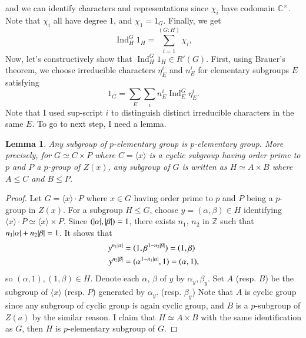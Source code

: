 \documentclass[a4paper, 12pt]{article}
\theoremstyle{Mydefinition}
\theoremstyle{Mytheorem}
\newtheorem{lemma}[statement]{Lemma}
\DeclareMathOperator{\Ind}{Ind}
\begin{document}
\begin{enumerate}
    and we can identify characters and representations since $\chi_i$ have codomain $\mathbb{C}^\times$. Note that $\chi_i$ all have degree $1$, and $\chi_1 = 1_G$. Finally, we get 
    \begin{equation}
        \Ind_H^G 1_H = \sum_{i=1}^{(G:H)}\chi_i,
    \end{equation}
    Now, let's constructively show that $\Ind_H^G 1_H\in R'(G)$. First, using Brauer's theorem, we choose irreducible characters $\eta^i_E$ and $n_E^i$ for elementary subgroups $E$ satisfying
    \begin{equation}\label{HW9:Eq:1}
        1_G = \sum_{E}\sum_i n_E^i\Ind_E^G \eta^i_E.
    \end{equation}
    Note that I used sup-script $i$ to distinguish distinct irreducible characters in the same $E$. 
    To go to next step, I need a lemma.
    \begin{lemma}
    Any subgroup of $p$-elementary group is $p$-elementary group. More precisely, for $G\simeq C\times P$ where $C=\langle x\rangle$ is a cyclic subgroup having order prime to $p$ and $P$ a $p$-group of $Z(x)$, any subgroup of $G$ is written as $H\simeq A\times B$ where $A\leq C$ and $B\leq P$.
    \end{lemma}
    \begin{proof}
    Let $G=\langle x\rangle\cdot P$ where $x\in G$ having order prime to $p$ and $P$ being a $p$-group in $Z(x)$. For a subgroup $H\leq G$, choose $y=(\alpha, \beta)\in H$ identifying $\langle x\rangle\cdot P\simeq \langle x\rangle\times P$. Since $(\abs{\alpha},\abs{\beta})=1$, there exists $n_1$, $n_2$ in $\mathbb{Z}$ such that $n_1\abs{\alpha}+n_2\abs{\beta} = 1$. It shows that
    \begin{equation}
    \begin{split}
        y^{n_1\abs{\alpha}} &= (1, \beta^{1-n_2\abs{\beta}}) = (1,\beta)\\
        y^{n_2\abs{\beta}} &= (\alpha^{1-n_1\abs{\alpha}}, 1) = (\alpha,1),
    \end{split}
    \end{equation}
    so $(\alpha,1),(1,\beta)\in H$. Denote each $\alpha$, $\beta$ of $y$ by $\alpha_y, \beta_y$. Set $A$ (resp. $B$) be the subgroup of $\langle x\rangle$ (resp. $P$) generated by $\alpha_y$. (resp. $\beta_y$) Note that $A$ is cyclic group since any subgroup of cyclic group is again cyclic group, and $B$ is a $p$-subgroup of $Z(a)$ by the similar reason. I claim that $H\simeq A \times B$ with the same identification as $G$, then $H$ is $p$-elementary subgroup of $G$.
    

\end{proof}
\end{enumerate}
\end{document}

